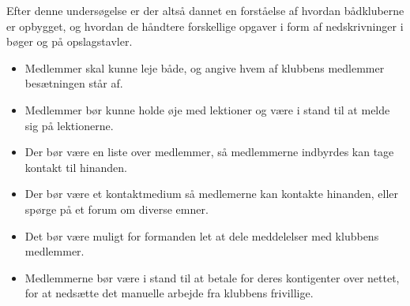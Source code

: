 Efter denne undersøgelse er der altså dannet en forståelse af hvordan bådkluberne er opbygget, og hvordan de håndtere forskellige opgaver i form af nedskrivninger i bøger og på opslagstavler.


\begin{itemize}
	\item Medlemmer skal kunne leje både, og angive hvem af klubbens medlemmer besætningen står af.
	\item Medlemmer bør kunne holde øje med lektioner og være i stand til at melde sig på lektionerne.
	\item Der bør være en liste over medlemmer, så medlemmerne indbyrdes kan tage kontakt til hinanden.
	\item Der bør være et kontaktmedium så medlemerne kan kontakte hinanden, eller spørge på et forum om diverse emner.
	\item Det bør være muligt for formanden let at dele meddelelser med klubbens medlemmer. 
	\item Medlemmerne bør være i stand til at betale for deres kontigenter over nettet, for at nedsætte det manuelle arbejde fra klubbens frivillige.
\end{itemize}
\cbend
